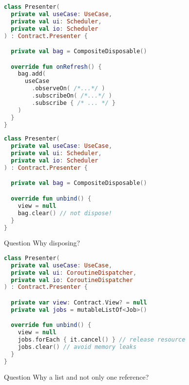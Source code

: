 \documentclass[10pt]{beamer}
\begin{document}
\begin{frame}[fragile]
\begin{lstlisting}[language=Kotlin, basicstyle=\ttfamily]
class Presenter(
  private val useCase: UseCase,
  private val ui: Scheduler,
  private val io: Scheduler
) : Contract.Presenter {

  private val bag = CompositeDisposable()

  override fun onRefresh() {
    bag.add(
      useCase
        .observeOn( /*...*/ )
        .subscribeOn( /*...*/ )
        .subscribe { /* ... */ }
    )
  }
}
\end{lstlisting}
\end{frame}




\begin{frame}[fragile]
\begin{lstlisting}[language=Kotlin, basicstyle=\ttfamily]
class Presenter(
  private val useCase: UseCase,
  private val ui: Scheduler,
  private val io: Scheduler
) : Contract.Presenter {

  private val bag = CompositeDisposable()

  override fun unbind() {
    view = null
    bag.clear() // not dispose!
  }
}
\end{lstlisting}
\end{frame}

\begin{frame}[fragile]
	\begin{alertblock}{Question}
Why disposing?
\end{alertblock}
\end{frame}

\begin{frame}[fragile]
\begin{lstlisting}[language=Kotlin, basicstyle=\ttfamily]
class Presenter(
  private val useCase: UseCase,
  private val ui: CoroutineDispatcher,
  private val io: CoroutineDispatcher
) : Contract.Presenter {

  private var view: Contract.View? = null
  private val jobs = mutableListOf<Job>()

  override fun unbind() {
    view = null
    jobs.forEach { it.cancel() } // release resource 
    jobs.clear() // avoid memory leaks
  }
}
\end{lstlisting}
\end{frame}

\begin{frame}[fragile]
	\begin{alertblock}{Question}
Why a list and not only one reference?
\end{alertblock}
\end{frame}
\end{document}
